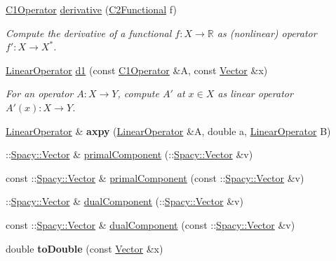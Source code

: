 \begin{DoxyCompactItemize}
\hyperlink{classSpacy_1_1C1Operator}{C1\+Operator} \hyperlink{namespaceSpacy_a002fe344fa6d04a6ac59a74ea25fddb6}{derivative} (\hyperlink{classSpacy_1_1C2Functional}{C2\+Functional} f)
\begin{DoxyCompactList}\small\item\em Compute the derivative of a functional $ f: X\to \mathbb{R} $ as (nonlinear) operator $ f':X\to X^* $. \end{DoxyCompactList}\item 
\hyperlink{classSpacy_1_1LinearOperator}{Linear\+Operator} \hyperlink{namespaceSpacy_a2205e2a2c4bb5242665bbc09929d35d2}{d1} (const \hyperlink{classSpacy_1_1C1Operator}{C1\+Operator} \&A, const \hyperlink{classSpacy_1_1Vector}{Vector} \&x)
\begin{DoxyCompactList}\small\item\em For an operator $ A: X\to Y $, compute $A'$ at $x\in X$ as linear operator $ A'(x): X \to Y $. \end{DoxyCompactList}\item 
\hypertarget{namespaceSpacy_a55ac280003bc1cafd067f7a956e2042c}{}\hyperlink{classSpacy_1_1LinearOperator}{Linear\+Operator} \& {\bfseries axpy} (\hyperlink{classSpacy_1_1LinearOperator}{Linear\+Operator} \&A, double a, \hyperlink{classSpacy_1_1LinearOperator}{Linear\+Operator} B)\label{namespaceSpacy_a55ac280003bc1cafd067f7a956e2042c}

\item 
\+::\hyperlink{classSpacy_1_1Vector}{Spacy\+::\+Vector} \& \hyperlink{group__ProductSpaceGroup_gaa040ba5c24284687e0df19c99dd688a6}{primal\+Component} (\+::\hyperlink{classSpacy_1_1Vector}{Spacy\+::\+Vector} \&v)
\item 
const \+::\hyperlink{classSpacy_1_1Vector}{Spacy\+::\+Vector} \& \hyperlink{group__ProductSpaceGroup_ga88c5bcc74072f75c63ab7d9448f80a7e}{primal\+Component} (const \+::\hyperlink{classSpacy_1_1Vector}{Spacy\+::\+Vector} \&v)
\item 
\+::\hyperlink{classSpacy_1_1Vector}{Spacy\+::\+Vector} \& \hyperlink{group__ProductSpaceGroup_gafe51c084e3b03205db94e91309e834f7}{dual\+Component} (\+::\hyperlink{classSpacy_1_1Vector}{Spacy\+::\+Vector} \&v)
\item 
const \+::\hyperlink{classSpacy_1_1Vector}{Spacy\+::\+Vector} \& \hyperlink{group__ProductSpaceGroup_gabe5978657aab46b1575e2521b336407d}{dual\+Component} (const \+::\hyperlink{classSpacy_1_1Vector}{Spacy\+::\+Vector} \&v)
\item 
\hypertarget{namespaceSpacy_aa483f25537054790b8c29403999e7c11}{}double {\bfseries to\+Double} (const \hyperlink{classSpacy_1_1Vector}{Vector} \&x)\label{namespaceSpacy_aa483f25537054790b8c29403999e7c11}


\end{DoxyCompactItemize}
